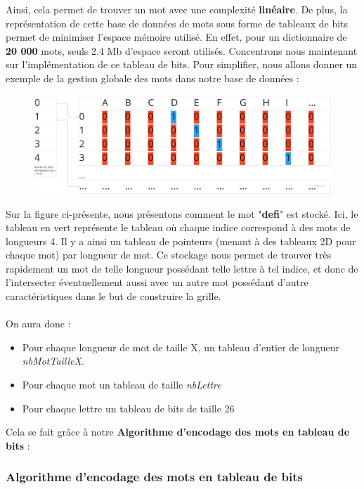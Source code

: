 \documentclass [ 11 pt ] {article}
\begin{document}
    Ainsi, cela permet de trouver un mot avec une complexité \textbf{linéaire}. De plus, la représentation de cette base de données de mots sous forme de tableaux de bits permet de minimiser l'espace mémoire utilisé. En effet, pour un dictionnaire de \textbf{20 000} mots, seuls 2.4 Mb d'espace seront utilisés. Concentrons nous maintenant sur l'implémentation de ce tableau de bits. Pour simplifier, nous allons donner un exemple de la gestion globale des mots dans notre base de données :
    
    \begin{figure}[H] 
    \center 
    \includegraphics[width=1\linewidth]{database_schema.jpg}
    \end{figure}
    
    Sur la figure ci-présente, nous présentons comment le mot "\textbf{defi}" est stocké. Ici, le tableau en vert représente le tableau où chaque indice correspond à des mots de longueurs 4. Il y a ainsi un tableau de pointeurs (menant à des tableaux 2D pour chaque mot) par longueur de mot. Ce stockage nous permet de trouver très rapidement un mot de telle longueur possédant telle lettre à tel indice, et donc de l'intersecter éventuellement aussi avec un autre mot possédant d'autre caractéristiques dans le but de construire la grille.
    \\\\On aura donc :
    \begin{itemize}
        \item Pour chaque longueur de mot de taille X, un tableau d'entier de longueur \textit{nbMotTailleX}.
        \item Pour chaque mot un tableau de taille \textit{nbLettre}
        \item Pour chaque lettre un tableau de bits de taille 26
    \end{itemize}
    
    Cela se fait grâce à notre \textbf{Algorithme d'encodage des mots en tableau de bits} :
    

    \subsubsection{Algorithme d'encodage des mots en tableau de bits}
    
\end{document}
